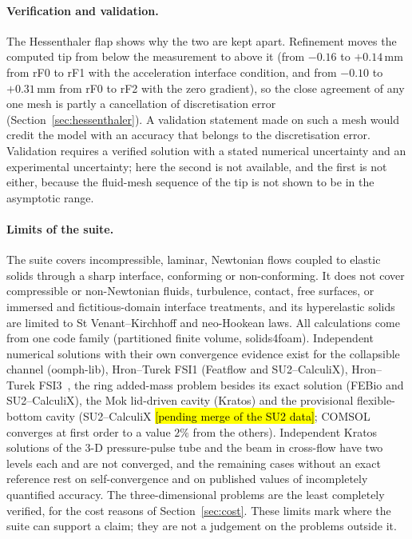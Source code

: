 \paragraph{Verification and validation.}
The Hessenthaler flap shows why the two are kept apart.
Refinement moves the computed tip from below the measurement to above it (from $-0.16$ to $+0.14\,\mathrm{mm}$ from rF0 to rF1 with the acceleration interface condition, and from $-0.10$ to $+0.31\,\mathrm{mm}$ from rF0 to rF2 with the zero gradient), so the close agreement of any one mesh is partly a cancellation of discretisation error (Section~\ref{sec:hessenthaler}).
A validation statement made on such a mesh would credit the model with an accuracy that belongs to the discretisation error.
Validation requires a verified solution with a stated numerical uncertainty and an experimental uncertainty; here the second is not available, and the first is not either, because the fluid-mesh sequence of the tip is not shown to be in the asymptotic range.

\paragraph{Limits of the suite.}
The suite covers incompressible, laminar, Newtonian flows coupled to elastic solids through a sharp interface, conforming or non-conforming.
It does not cover compressible or non-Newtonian fluids, turbulence, contact, free surfaces, or immersed and fictitious-domain interface treatments, and its hyperelastic solids are limited to St Venant--Kirchhoff and neo-Hookean laws.
All calculations come from one code family (partitioned finite volume, solids4foam). Independent numerical solutions with their own convergence evidence exist for the collapsible channel (oomph-lib), Hron--Turek FSI1 (Featflow and SU2--CalculiX), Hron--Turek FSI3~\citep{Failer2020}, the ring added-mass problem besides its exact solution (FEBio and SU2--CalculiX), the Mok lid-driven cavity (Kratos) and the provisional flexible-bottom cavity (SU2--CalculiX \hl{[pending merge of the SU2 data]}; COMSOL converges at first order to a value $2\%$ from the others).
Independent Kratos solutions of the 3-D pressure-pulse tube and the beam in cross-flow have two levels each and are not converged, and the remaining cases without an exact reference rest on self-convergence and on published values of incompletely quantified accuracy.
The three-dimensional problems are the least completely verified, for the cost reasons of Section~\ref{sec:cost}.
These limits mark where the suite can support a claim; they are not a judgement on the problems outside it.

